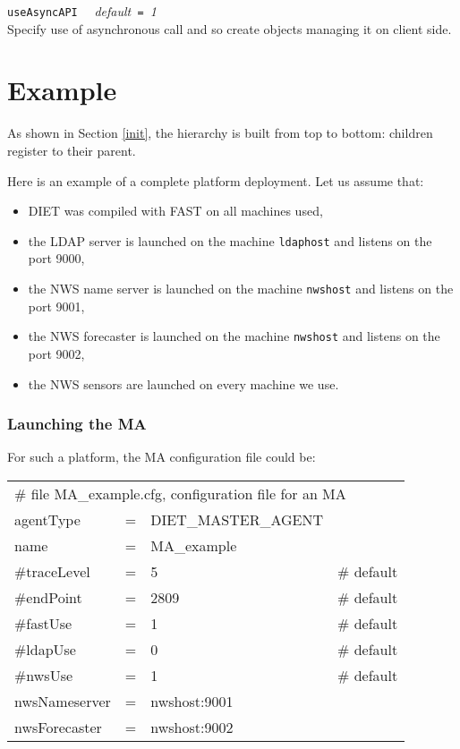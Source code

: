 \texttt{useAsyncAPI} \ \ \emph{default}\texttt{ = }\emph{1}\\
Specify use of asynchronous call and so create objects managing it
on client side.

\section{Example}
\label{sec:deploy_ex}

As shown in Section \ref{init}, the hierarchy is built from top to
bottom: children register to their parent.

Here is an example of a complete platform deployment. Let us assume that:

\begin{itemize}
\item DIET was compiled with FAST on all machines used,
\item the LDAP server is launched on the machine \texttt{ldaphost} and listens
  on the port 9000,
\item the NWS name server is launched on the machine \texttt{nwshost} and
  listens on the port 9001,
\item the NWS forecaster is launched on the machine \texttt{nwshost} and
  listens on the port 9002,
\item the NWS sensors are launched on every machine we use.
\end{itemize}


\subsubsection{Launching the MA}

For such a platform, the MA configuration file could be:
\tt
\begin{center}
 \footnotesize
 \begin{tabular}{lcll}
  \multicolumn{4}{l}{\# file MA\_example.cfg, configuration file for an MA}\\
  agentType    &=&DIET\_MASTER\_AGENT&\\
  name         &=&MA\_example        &\\
  \#traceLevel &=&5                  &\# default\\
  \#endPoint   &=&2809               &\# default\\
  \#fastUse    &=&1                  &\# default\\
  \#ldapUse    &=&0                  &\# default\\
  \#nwsUse     &=&1                  &\# default\\
  nwsNameserver&=&nwshost:9001       &\\
  nwsForecaster&=&nwshost:9002       &\\
 \end{tabular}
\end{center}
\rm


